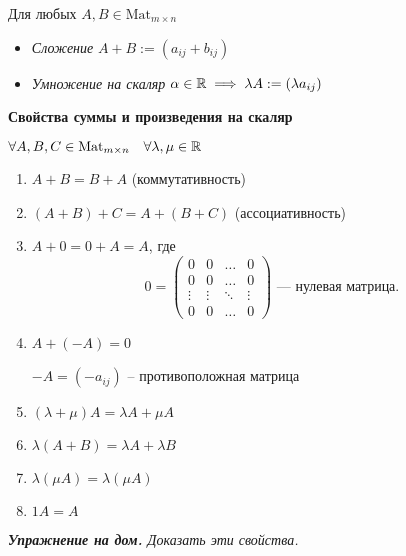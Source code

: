 Для любых $A, B \in \text{Mat}_{m \times n}$

\begin{itemize}
    \item \emph{Сложение} $A + B := (a_{ij} + b_{ij})$
    \item \emph{Умножение на скаляр} $\alpha \in \mathbb{R} \implies \lambda A := (\lambda a_{ij})$
\end{itemize}

\textbf{Свойства суммы и произведения на скаляр}

$\forall A, B, C  \in \text{Mat}_{m \times n} \quad \forall \lambda, \mu \in \mathbb{R}$
\begin{enumerate}[label=\arabic*), nosep]
    \item $A + B = B + A$ (коммутативность)

    \item $(A + B) + C = A + (B + C)$ (ассоциативность)

    \item $A + 0 = 0 + A = A$, где 
        \begin{equation*}
            0 = \begin{pmatrix}
                0 & 0 & \dots & 0 \\
                0 & 0 & \dots & 0 \\
                \vdots & \vdots & \ddots & \vdots \\
                0 & 0 & \dots & 0
            \end{pmatrix} \text{ --- нулевая матрица}
        .\end{equation*}

    \item $A + (-A) = 0$
    
        $-A = (-a_{ij})$ -- противоположная матрица

    \item $(\lambda + \mu) A = \lambda A + \mu A$

    \item $\lambda (A + B) = \lambda A + \lambda B$

    \item $\lambda (\mu A) = \lambda (\mu A)$

    \item $1 A = A$
\end{enumerate}

\bigskip
\textit{\textbf{Упражнение на дом.} Доказать эти свойства.}

\begin{comment}
    Из свойств 1) -- 8) следует, что $\text{Mat}_{n \times m}(\RR)$ является векторным пространством над \( \RR \)
\end{comment}


